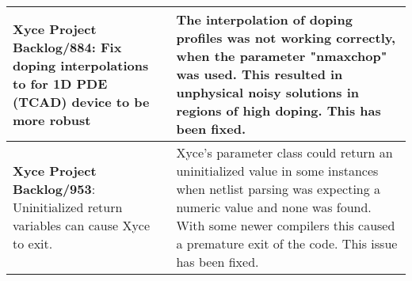 {\begin{longtable}[h] {>{\raggedright\small}m{2in}|>{\raggedright\let\\\tabularnewline\small}m{3.5in}}
  \textbf{Xyce Project Backlog/884}: Fix doping interpolations to for 1D PDE (TCAD) device to be more robust
  & The interpolation of doping profiles was not working correctly, when the parameter "nmaxchop" was used.  
  This resulted in unphysical noisy solutions in regions of high doping.  This has been fixed.
  \\\hline
  
  \textbf{Xyce Project Backlog/953}: Uninitialized return variables can cause Xyce to exit.
  &  Xyce's parameter class could return an uninitialized value in some instances when 
  netlist parsing was expecting a numeric value and none was found.  With some newer compilers
  this caused a premature exit of the code.  This issue has been fixed.
  \\\hline
  


\end{longtable}
}
